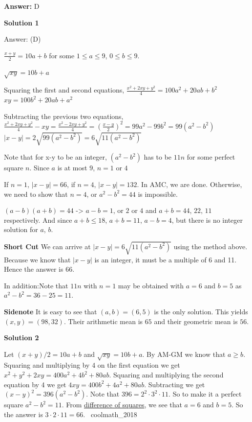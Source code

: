 \begin{enumerate}
 \textbf{Answer: }D



\textbf{Solution 1}

Answer: (D)

 $\frac{x + y}{2} = 10 a+b$ for some $1\le a\le 9$, $0\le b\le 9$.

 $\sqrt{xy} = 10 b+a$

 Squaring the first and second equations, $\frac{x^2 + 2xy + y^2}{4}=100 a^2 + 20 ab + b^2$
$xy = 100b^2 + 20ab + a^2$

 Subtracting the previous two equations, $\frac{x^2 + 2xy + y^2}{4} - xy = \frac{x^2 - 2xy + y^2}{4} = \left(\frac{x-y}{2}\right)^2 = 99 a^2 - 99 b^2 = 99(a^2 - b^2)$
$|x-y| = 2\sqrt{99(a^2 - b^2)}=6\sqrt{11(a^2 - b^2)}$

 Note that for x-y to be an integer, $(a^2 - b^2)$ has to be $11n$ for some perfect square $n$. Since $a$ is at most $9$, $n = 1$ or $4$

 If $n = 1$, $|x-y| = 66$, if $n = 4$, $|x-y| = 132$. In AMC, we are done. Otherwise, we need to show that $n=4$, or $a^2 -b^2 = 44$ is impossible.

 $(a-b)(a+b) = 44$ -> $a-b = 1$, or $2$ or $4$ and $a+b = 44$, $22$, $11$ respectively. And since $a+b \le 18$, $a+b = 11$, $a-b = 4$, but there is no integer solution for $a$, $b$.

 \textbf{Short Cut} We can arrive at $|x-y| = 6\sqrt{11(a^2 - b^2)}$ using the method above. Because we know that $|x-y|$ is an integer, it must be a multiple of 6 and 11. Hence the answer is $66.$

 In addition:Note that $11n$ with $n = 1$ may be obtained with $a = 6$ and $b = 5$ as $a^2 - b^2 = 36 - 25 = 11$.

 \textbf{Sidenote} It is easy to see that $(a,b)=(6,5)$ is the only solution. This yields $(x,y)=(98,32)$. Their arithmetic mean is $65$ and their geometric mean is $56$.

 



\textbf{Solution 2}

Let $(x+y)/2 = 10a + b$ and $\sqrt{xy} = 10b + a$. By AM-GM we know that $a \ge b$. Squaring and multiplying by 4 on the first equation we get $x^2 + y^2 + 2xy = 400a^2 + 4b^2 + 80ab$. Squaring and multiplying the second equation by 4 we get $4xy = 400b^2 + 4a^2 + 80ab$. Subtracting we get $(x-y)^2 = 396(a^2 - b^2)$. Note that $396 = 2^2 \cdot 3^2 \cdot 11$. So to make it a perfect square $a^2 - b^2 = 11$. From \href{https://artofproblemsolving.com/wiki/index.php?title=Difference\_of\_squares}{difference of squares}, we see that $a = 6$ and $b = 5$. So the answer is $3 \cdot 2 \cdot 11 = 66$. ~coolmath\_2018


\end{enumerate}
